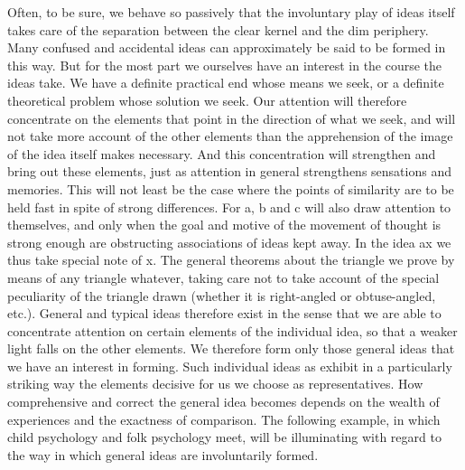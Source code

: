\documentclass[12pt,a4paper]{book}
\newcommand{\opage}[1]{\marginnote{\footnotesize\textit{[#1]}}}
\begin{document}
Often, to be sure, we behave so passively that the involuntary play of
ideas itself takes care of the separation between the clear kernel and
the dim periphery. Many confused and accidental ideas can approximately
be said to be formed in this way. But for the most part we ourselves
have an interest in the course the ideas take. We have a definite
practical end whose means we seek, or a definite theoretical problem
whose solution we seek. Our attention will therefore concentrate on the
elements that point in the direction of what we seek, and will not take
more account of the other elements than the apprehension of the image of
the idea itself makes necessary. And this concentration will strengthen
and bring out these elements, just as attention in general strengthens
sensations and memories. This will not least be the case where the
points of similarity are to be held fast in spite of strong differences.
For a, b and c will also draw attention to themselves, and only when the
goal and motive of the movement of thought is strong enough are
obstructing associations of ideas kept away. In the idea ax we thus take
special note of x. The general theorems about the triangle we prove by
means of any triangle whatever, taking care not to take account of the
special peculiarity of the triangle drawn (whether it is right-angled or
obtuse-angled, etc.). General and typical ideas therefore exist in the
sense that we are able to concentrate attention on certain elements of
the individual idea, so that a
\opage{204}weaker light falls on the other elements. We therefore form
only those general ideas that we have an interest in forming. Such
individual ideas as exhibit in a particularly striking way the elements
decisive for us we choose as representatives. How comprehensive and
correct the general idea becomes depends on the wealth of experiences
and the exactness of comparison. The following example, in which child
psychology and folk psychology meet, will be illuminating with regard to
the way in which general ideas are involuntarily formed.
\end{document}

